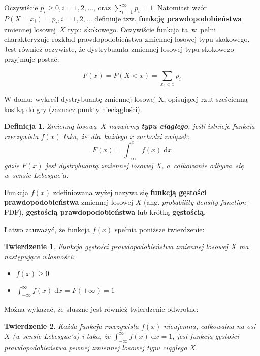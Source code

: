 \documentclass[10pt,a4paper]{article}
\newtheorem{definition}{Definicja}[section]
\newtheorem{theorem}{Twierdzenie}[section]
\newcommand{\dd}{\; \mathrm{d}}
\numberwithin{equation}{subsection}
\begin{document}
Oczywiście $p_i\geq0, i=1,2,\dotsc$, oraz $\sum_{i=1}^{\infty}p_i=1$. Natomiast
wzór $P(X=x_i)=p_i,i=1,2,\dotsc$ definiuje tzw. \textbf{funkcję
  prawdopodobieństwa} zmiennej losowej~$X$ typu skokowego. Oczywiście funkcja
ta~w~pełni charakteryzuje rozkład prawdopodobieństwa zmiennej losowej typu
skokowego. Jest również oczywiste, że dystrybuanta zmiennej losowej typu
skokowego przyjmuje postać:

\begin{equation}
  F(x) = P(X<x) = \sum_{x_i<x}p_i
\end{equation}

W domu: wykreśl dystrybuantę zmiennej losowej X, opisującej rzut sześcienną
kostką do gry (zaznacz punkty nieciągłości).

\begin{definition}
  Zmienną losową~$X$ nazwiemy \textbf{typu ciągłego}, jeśli istnieje funkcja
  rzeczywista $f(x)$ taka, że~dla~każdego $x$ zachodzi związek:
  \begin{equation}
    F(x)=\int_{-\infty}^{x}f(x)\dd{x}
  \end{equation}
  gdzie $F(x)$ jest dystrybuantą zmiennej losowej $X$, a~całkowanie odbywa~się
  w~sensie Lebesgue'a.
\end{definition}

Funkcja $f(x)$ zdefiniowana wyżej nazywa się \textbf{funkcją gęstości
prawdopodobieństwa} zmiennej losowej $X$ (ang. \textit{probability density
function} - PDF), \textbf{gęstością prawdopodobieństwa} lub krótką
\textbf{gęstością}.

Łatwo zauważyć, że funkcja $f(x)$ spełnia poniższe twierdzenie:

\begin{theorem}
  Funkcja gęstości prawdopodobieństwa zmiennej losowej $X$ ma następujące
  własności:
  \begin{itemize}
    \item $f(x) \geq 0$
    \item $\int_{-\infty}^\infty f(x)\dd{x} = F(+\infty) = 1$
  \end{itemize}
\end{theorem}

Można wykazać, że słuszne jest również twierdzenie odwrotne:

\begin{theorem}
  Każda funkcja rzeczywista $f(x)$ nieujemna, całkowalna na osi $X$ (w sensie
  Lebesgue'a) i taka, że $\int_{-\infty}^\infty f(x)\dd{x} = 1$, jest funkcją
  gęstości prawdopodobieństwa pewnej zmiennej losowej typu ciągłego $X$.
\end{theorem}
\end{document}
